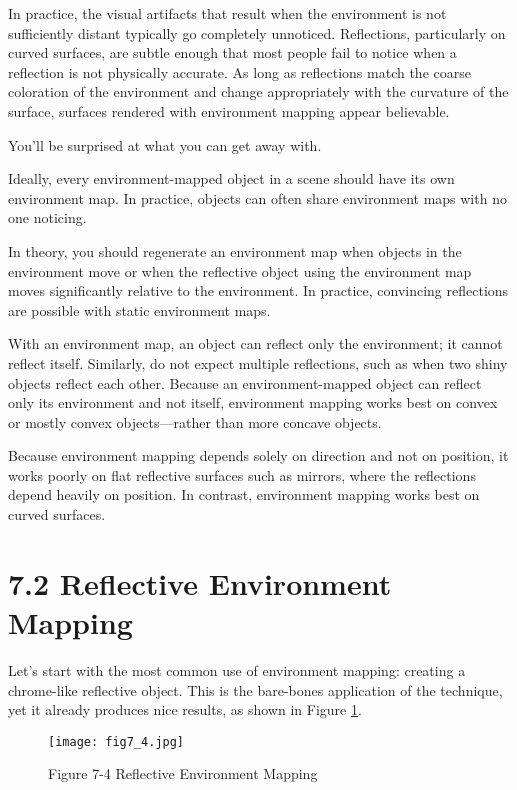 \documentclass[../main.tex]{subfiles}
\begin{document}
In practice, the visual artifacts that result when the environment is not sufficiently distant typically go completely unnoticed. Reflections, particularly on curved surfaces, are subtle enough that most people fail to notice when a reflection is not physically accurate. As long as reflections match the coarse coloration of the environment and change appropriately with the curvature of the surface, surfaces rendered with environment mapping appear believable.

You'll be surprised at what you can get away with.

Ideally, every environment-mapped object in a scene should have its own environment map. In practice, objects can often share environment maps with no one noticing.

In theory, you should regenerate an environment map when objects in the environment move or when the reflective object using the environment map moves significantly relative to the environment. In practice, convincing reflections are possible with static environment maps.

With an environment map, an object can reflect only the environment; it cannot reflect itself. Similarly, do not expect multiple reflections, such as when two shiny objects reflect each other. Because an environment-mapped object can reflect only its environment and not itself, environment mapping works best on convex or mostly convex objects—rather than more concave objects.

Because environment mapping depends solely on direction and not on position, it works poorly on flat reflective surfaces such as mirrors, where the reflections depend heavily on position. In contrast, environment mapping works best on curved surfaces.

\section{7.2 Reflective Environment Mapping}

Let's start with the most common use of environment mapping: creating a chrome-like reflective object. This is the bare-bones application of the technique, yet it already produces nice results, as shown in Figure \ref{fig:7-4}.

\begin{figure}
    \centering
    \texttt{[image: fig7\_4.jpg]}
    \caption{Figure 7-4 Reflective Environment Mapping}
    \label{fig:7-4}
\end{figure}
\end{document}
